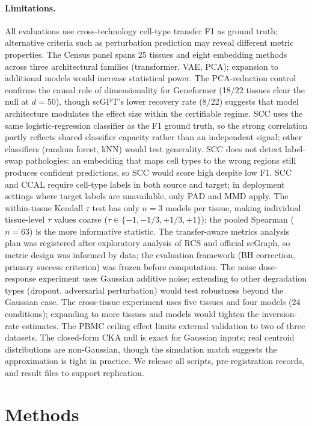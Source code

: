 \documentclass[11pt]{article}
\begin{document}
\paragraph{Limitations.} All evaluations use cross-technology cell-type
transfer F1 as ground truth; alternative criteria such as perturbation
prediction may reveal different metric properties. The Census panel
spans 25 tissues and eight embedding methods across three architectural
families (transformer, VAE, PCA); expansion to additional models would
increase statistical power. The PCA-reduction control confirms the
causal role of dimensionality for Geneformer (18/22 tissues clear the
null at $d = 50$), though scGPT's lower recovery rate (8/22) suggests
that model architecture modulates the effect size within the certifiable
regime. SCC uses the same logistic-regression classifier as the F1
ground truth, so the strong correlation partly reflects shared
classifier capacity rather than an independent signal; other classifiers
(random forest, kNN) would test generality. SCC does not detect
label-swap pathologies: an embedding that maps cell types to the wrong
regions still produces confident predictions, so SCC would score high
despite low F1. SCC and CCAL require cell-type labels in both source and
target; in deployment settings where target labels are unavailable, only
PAD and MMD apply. The within-tissue Kendall $\tau$ test has only
$n = 3$ models per tissue, making individual tissue-level $\tau$ values
coarse ($\tau \in \{-1, -1/3, +1/3, +1\}$); the pooled Spearman
($n = 63$) is the more informative statistic. The transfer-aware metrics
analysis plan was registered after exploratory analysis of RCS and
official scGraph, so metric design was informed by data; the evaluation
framework (BH correction, primary success criterion) was frozen before
computation. The noise dose-response experiment uses Gaussian additive
noise; extending to other degradation types (dropout, adversarial
perturbation) would test robustness beyond the Gaussian case. The
cross-tissue experiment uses five tissues and four models (24
conditions); expanding to more tissues and models would tighten the
inversion-rate estimates. The PBMC ceiling effect limits external
validation to two of three datasets. The closed-form CKA null is exact
for Gaussian inputs; real centroid distributions are non-Gaussian, though
the simulation match suggests the approximation is tight in practice. We
release all scripts, pre-registration records, and result files to
support replication.


\section{Methods}
\end{document}
